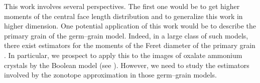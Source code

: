 \documentclass[numbers,compress,v1.0.1]{vmsta}
\theoremstyle{definition}
\begin{document}
This work involves several perspectives. The first one would be to get
higher moments of the central face length distribution and to
generalize this work in higher dimension. One potential application of
this work would be to describe the primary grain of the germ--grain
model. Indeed, in a large class of such models, there exist estimators
for the moments of the Feret diameter of the primary grain \cite{GSI}.
In particular, we prospect to apply this to the images of oxalate
ammonium crystals  by the Boolean model (see \citep
{GSI,ICSIA}). However, we need to study the estimators involved by the
zonotope approximation in those germ--grain models.

%
\end{document}
